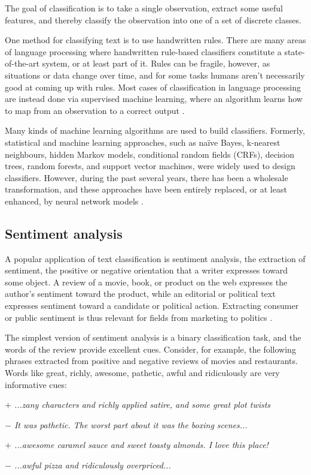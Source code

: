 The goal of classification is to take a single observation, extract some useful features, and thereby classify the observation into one of a set of discrete classes.

One method for classifying text is to use handwritten rules. There are many areas of language processing where handwritten rule-based classifiers constitute a state-of-the-art system, or at least part of it. Rules can be fragile, however, as situations or data change over time, and for
some tasks humans aren't necessarily good at coming up with rules. Most cases of classification in language processing are instead done via supervised machine learning, where an algorithm learns how to map from an observation to a correct output \cite{Jurafsky2009}.

Many kinds of machine learning algorithms are used to build classifiers.
Formerly, statistical and machine learning approaches, such as naïve Bayes, k-nearest neighbours, hidden Markov models, conditional random fields (CRFs), decision trees, random forests, and support vector machines, were widely used to design classifiers. 
However, during the past several years, there has been a wholesale transformation, and these approaches have been entirely replaced, or at least enhanced, by neural network models \cite{surveyNlpDeepLearning}. 

\subsection{Sentiment analysis}\label{subsec:sentiment-analysis}
A popular application of text classification is sentiment analysis, the extraction of sentiment, the positive or negative orientation that a writer expresses toward some object. A review of a movie, book, or product on the web expresses the author's sentiment toward the product, while an editorial or political text expresses sentiment toward a candidate or political action. Extracting consumer or public sentiment is thus relevant for fields from marketing to politics \cite{Jurafsky2009}.

The simplest version of sentiment analysis is a binary classification task, and
the words of the review provide excellent cues. Consider, for example, the following phrases extracted from positive and negative reviews of movies and restaurants. Words like great, richly, awesome, pathetic, awful and ridiculously are very informative cues:

\emph{$+$ ...zany characters and richly applied satire, and some great plot twists}
\par
\emph{$-$ It was pathetic. The worst part about it was the boxing scenes...}
\par
\emph{$+$ ...awesome caramel sauce and sweet toasty almonds. I love this place!}
\par
\emph{$-$ ...awful pizza and ridiculously overpriced...} 

